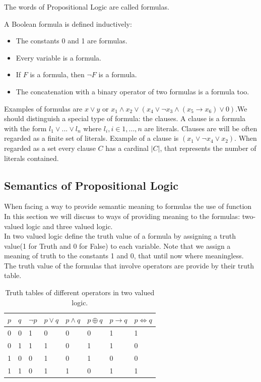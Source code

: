 The words of Propositional Logic are called formulas.
\begin{definition}
  A Boolean formula is defined inductively:
  \begin{itemize}
  \item The constants 0 and 1 are formulas.
  \item Every variable is a formula.
  \item If $F$ is a formula, then $\neg  F$ is a formula.
  \item The concatenation with a binary operator of two formulas is a formula too.\\
  \end{itemize}
\end{definition}

Examples of formulas are $x\vee y$ or $x_1\wedge x_2 \vee  ( x_4 \vee \neg  x_3 \wedge (x_5\to x_6) \vee 0 )$.We should distinguish a special type of formula: the clauses. A clause  is a formula with the form $l_1\vee ... \vee l_n$ where $l_i, i \in 1,...,n$ are literals. Clauses are will be often regarded as a finite set of literals. Example of a clause is $(x_1\vee \neg x_4 \vee x_2)$. When regarded as a set every clause $C$ has a cardinal $|C|$, that represents the number of literals contained. \\

\subsection{Semantics of Propositional Logic}
When facing a way to provide semantic meaning to formulas the use of function In this section we will discuss to ways of providing meaning to the formulas: two-valued logic and three valued logic.\\ 

In two valued logic define the truth value of a formula by assigning a truth value(1 for Truth and 0 for False) to each variable. Note that we assign a meaning of truth to the constants 1 and 0, that until now where meaningless. The truth value of the formulas that involve operators are provide by their truth table.


\begin{table}[h]
  \begin{center}
    \begin{tabular}{|l|l|l|l|l|l|l|l|}
      \hline
      $p$ & $q$ & $\neg p$& $p\vee q$ & $p\wedge q$ & $p \oplus q$ & $p \to q $ & $p \iff q$  \\ 
      \hline
      0 & 0 & 1 & 0 & 0 & 0 & 1&1\\
      0 & 1 & 1 & 1 & 0 & 1 & 1&0\\
      1 & 0 & 0 & 1 & 0 & 1 & 0&0\\
      1 & 1 & 0 & 1 & 1 & 0 & 1&1\\\hline
    \end{tabular}
  \end{center}
  \caption{\label{tab:table-name}Truth tables of different operators in two valued logic.}
\end{table}


